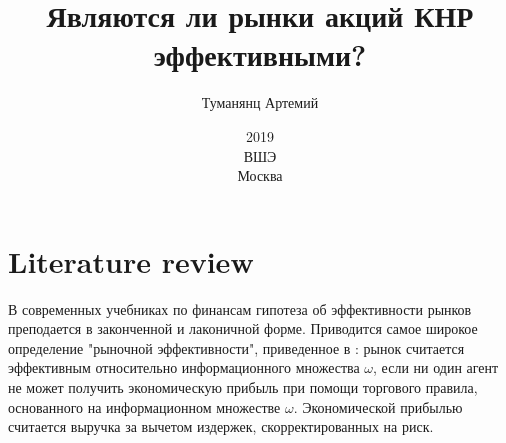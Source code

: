 ﻿\documentclass[a4paper,10pt]{article}
\title{Являются ли рынки акций КНР эффективными?}
\author{Туманянц Артемий}
\date{2019\\ВШЭ\\Москва}
\begin{document}
\maketitle
\section{Literature review}
В современных учебниках по финансам гипотеза об эффективности рынков преподается в законченной и лаконичной форме. Приводится самое широкое определение "рыночной эффективности", приведенное в \cite{Jensen1978}: рынок считается эффективным относительно информационного множества $\omega$, если ни один агент не может получить экономическую прибыль при помощи торгового правила, основанного на информационном множестве $\omega$. Экономической прибылью считается выручка за вычетом издержек, скорректированных на риск.
\newpage




\end{document}
